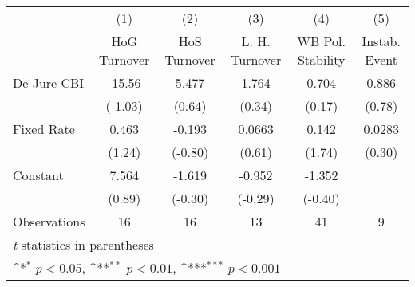 \begin{table}[htbp]\centering
\def\sym#1{\ifmmode^{#1}\else\(^{#1}\)\fi}
\caption{\label{NOhoshogIfivs3}}
\begin{tabular}{l*{5}{c}}
\toprule
                                        &\multicolumn{1}{c}{(1)}&\multicolumn{1}{c}{(2)}&\multicolumn{1}{c}{(3)}&\multicolumn{1}{c}{(4)}&\multicolumn{1}{c}{(5)}\\
                                        &\multicolumn{1}{c}{HoG Turnover}&\multicolumn{1}{c}{HoS Turnover}&\multicolumn{1}{c}{L. H. Turnover}&\multicolumn{1}{c}{WB Pol. Stability}&\multicolumn{1}{c}{Instab. Event}\\
\midrule
De Jure CBI                             &   -15.56         &    5.477         &    1.764         &    0.704         &    0.886         \\
                                        &  (-1.03)         &   (0.64)         &   (0.34)         &   (0.17)         &   (0.78)         \\
\addlinespace
Fixed Rate                              &    0.463         &   -0.193         &   0.0663         &    0.142         &   0.0283         \\
                                        &   (1.24)         &  (-0.80)         &   (0.61)         &   (1.74)         &   (0.30)         \\
\addlinespace
Constant                                &    7.564         &   -1.619         &   -0.952         &   -1.352         &                  \\
                                        &   (0.89)         &  (-0.30)         &  (-0.29)         &  (-0.40)         &                  \\
\midrule
Observations                            &       16         &       16         &       13         &       41         &        9         \\
\bottomrule
\multicolumn{6}{l}{\footnotesize \textit{t} statistics in parentheses}\\
\multicolumn{6}{l}{\footnotesize \sym{*} \(p<0.05\), \sym{**} \(p<0.01\), \sym{***} \(p<0.001\)}\\
\end{tabular}
\end{table}
